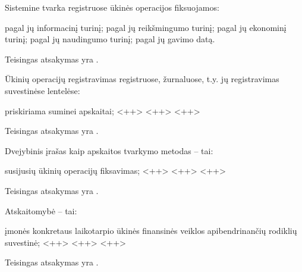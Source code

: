 \begin{tasks}
  \begin{task}
    \begin{condition}
      Sistemine tvarka registruose ūkinės operacijos fiksuojamos:
      \begin{enumerate}
         pagal jų informacinį turinį;
         pagal jų reikšmingumo turinį;
         pagal jų ekonominį turinį;
         pagal jų naudingumo turinį;
         pagal jų gavimo datą.
      \end{enumerate}
    \end{condition}
    \begin{solution}
      Teisingas atsakymas yra .
    \end{solution}
  \end{task}

  \begin{task}
    \begin{condition}
      Ūkinių operacijų registravimas registruose, žurnaluose, t.y.
      jų registravimas suvestinėse lentelėse:
      \begin{enumerate}
         priskiriama suminei apskaitai;
         <++>
         <++>
         <++>
      \end{enumerate}
    \end{condition}
    \begin{solution}
      Teisingas atsakymas yra .
    \end{solution}
  \end{task}

  \begin{task}
    \begin{condition}
      Dvejybinis įrašas kaip apskaitos tvarkymo metodas – tai:
      \begin{enumerate}
         susijusių ūkinių operacijų fiksavimas;
         <++>
         <++>
         <++>
      \end{enumerate}
    \end{condition}
    \begin{solution}
      Teisingas atsakymas yra .
    \end{solution}
  \end{task}

  \begin{task}
    \begin{condition}
      Atskaitomybė – tai:
      \begin{enumerate}
         įmonės konkretaus laikotarpio ūkinės finansinės veiklos
          apibendrinančių rodiklių suvestinė;
         <++>
         <++>
         <++>
      \end{enumerate}
    \end{condition}
    \begin{solution}
      Teisingas atsakymas yra .
    \end{solution}
  \end{task}


\end{tasks}
